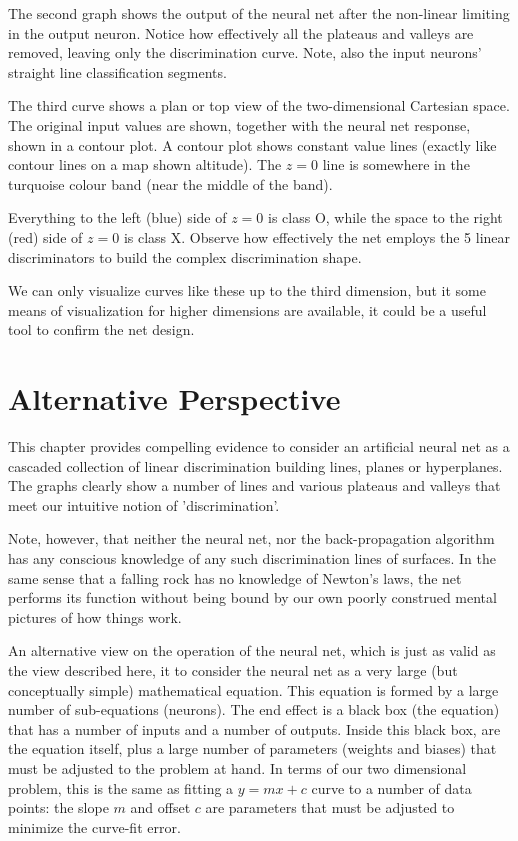 The second graph shows the output of the neural net after the non-linear limiting in the output neuron.  Notice how effectively all the plateaus and valleys are removed, leaving only the discrimination curve.  Note, also the input neurons' straight line classification segments.

The third curve shows a plan or top view of the two-dimensional Cartesian space.   The original input values are shown, together with the neural net response, shown in a contour plot.  A contour plot shows constant value lines (exactly like contour lines on a map shown altitude).  The $z=0$  line is somewhere in the turquoise colour band (near the middle of the band).  

Everything to the left (blue) side of $z=0$  is class O,  while the space to the right (red) side of $z=0$  is class X.  Observe how effectively the net employs the 5 linear discriminators to build the complex discrimination shape.  

We can only visualize curves like these up to the third dimension, but it some means of visualization for higher dimensions are available, it could be a useful tool to confirm the net design.

\FloatBarrier
\section{Alternative Perspective}

This chapter provides compelling evidence to consider an artificial  neural net as a cascaded collection of linear discrimination building lines, planes or hyperplanes.  The graphs clearly show a number of lines and various plateaus and valleys that meet our intuitive notion of 'discrimination'.

Note, however, that neither the neural net, nor the back-propagation algorithm has any conscious knowledge of any such discrimination lines of surfaces.  In the same sense that a falling rock has no knowledge of Newton's laws, the net performs its function without being bound by our own poorly construed mental pictures of how things work.

An alternative view on the operation of the neural net, which is just as valid as the  view described here, it to consider the neural net as a very large (but conceptually simple) mathematical equation.  This equation is formed by a large number of sub-equations (neurons).  The end effect is a black box (the equation) that has a number of inputs and a number of outputs.  Inside this black box, are the equation itself, plus a large number of parameters (weights and biases) that must be adjusted to the problem at hand.  In terms of our two dimensional problem, this is the same as fitting a $y=mx+c$ curve to a number of data points: the slope $m$ and offset $c$ are parameters that must be adjusted to minimize the curve-fit error.  

